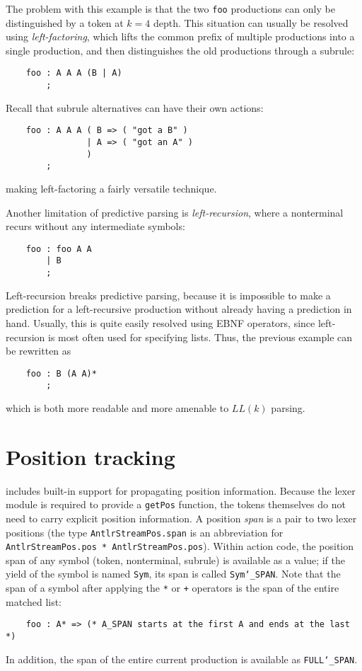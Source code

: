 The problem with this example is that the two \texttt{foo} productions can only be distinguished by a token at $k = 4$ depth.  This situation can usually be resolved using \emph{left-factoring}, which lifts the common prefix of multiple productions into a single production, and then distinguishes the old productions through a subrule:
\begin{verbatim}
    foo : A A A (B | A)
        ;
\end{verbatim}
Recall that subrule alternatives can have their own actions:
\begin{verbatim}
    foo : A A A ( B => ( "got a B" ) 
                | A => ( "got an A" )
                )
        ;
\end{verbatim}
making left-factoring a fairly versatile technique.

Another limitation of predictive parsing is \emph{left-recursion}, where a nonterminal recurs without any intermediate symbols:
\begin{verbatim}
    foo : foo A A
        | B
        ;
\end{verbatim}
Left-recursion breaks predictive parsing, because it is impossible to make a prediction for a left-recursive production without already having a prediction in hand.  Usually, this is quite easily resolved using EBNF operators, since left-recursion is most often used for specifying lists.  Thus, the previous example can be rewritten as
\begin{verbatim}
    foo : B (A A)*
        ;
\end{verbatim}
which is both more readable and more amenable to $LL(k)$ parsing.

\section{Position tracking}

\antlr{} includes built-in support for propagating position information.  Because the lexer module is required to provide a \texttt{getPos} function, the tokens themselves do not need to carry explicit position information.
A position \emph{span} is a pair to two lexer positions (the type \texttt{AntlrStreamPos.span} is an abbreviation for \texttt{AntlrStreamPos.pos * AntlrStreamPos.pos}).
Within action code, the position span of any symbol (token, nonterminal, subrule) is available as a value; if the yield of the symbol is named \texttt{Sym}, its span is called \texttt{Sym\char`\_SPAN}.
Note that the span of a symbol after applying the \texttt{*} or \texttt{+} operators is the span of the entire matched list:
\begin{verbatim}
    foo : A* => (* A_SPAN starts at the first A and ends at the last *)
\end{verbatim}
In addition, the span of the entire current production is available as \texttt{FULL\char`\_SPAN}.

